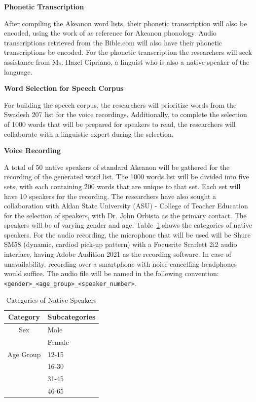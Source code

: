 \textbf{Phonetic Transcription}

After compiling the Akeanon word lists, their phonetic transcription will also be encoded, using the work of  as reference for Akeanon phonology. Audio transcriptions retrieved from the Bible.com will also have their phonetic transcriptions be encoded. For the phonetic transcription the researchers will seek assistance from Ms. Hazel Cipriano, a linguist who is also a native speaker of the language.

\textbf{Word Selection for Speech Corpus}

For building the speech corpus, the researchers will prioritize words from the Swadesh 207 list for the voice recordings. Additionally, to complete the selection of 1000 words that will be prepared for speakers to read, the researchers will collaborate with a linguistic expert during the selection.

\textbf{Voice Recording}

A total of 50 native speakers of standard Akeanon will be gathered for the recording of the generated word list. The 1000 words list will be divided into five sets, with each containing 200 words that are unique to that set. Each set will have 10 speakers for the recording. The researchers have also sought a collaboration with Aklan State University (ASU) - College of Teacher Education for the selection of speakers, with Dr. John Orbista as the primary contact. The speakers will be of varying gender and age. Table~\ref{tab:native_speakers} shows the categories of native speakers. For the audio recording, the microphone that will be used will be Shure SM58 (dynamic, cardiod pick-up pattern) with a Focusrite Scarlett 2i2 audio interface, having Adobe Audition 2021 as the recording software. In case of unavailability, recording over a smartphone with noise-cancelling headphones would suffice. The audio file will be named in the following convention: \texttt{\textless gender\textgreater\_\textless age\_group\textgreater\_\textless speaker\_number\textgreater}.

\begin{table}[ht]
   \centering
   \caption{Categories of Native Speakers} \vspace{0.25em}
   \label{tab:native_speakers}
   \renewcommand{\arraystretch}{1.5} %
   \setlength{\tabcolsep}{10pt} %

\begin{tabular}{|c|p{2in}|} \hline
   \centering Category & Subcategories \\ \hline
   Sex & Male \\ 
   & Female \\ 
   \hline
   Age Group & 12-15 \\ 
   & 16-30 \\ 
   & 31-45 \\ 
   & 46-65 \\ \hline
\end{tabular}
\end{table}

